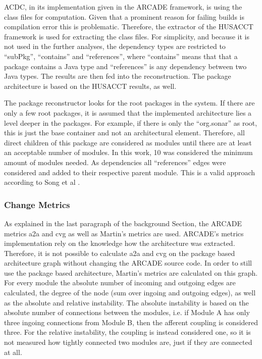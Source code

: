 \documentclass[conference]{IEEEtran}
\begin{document}
ACDC, in its implementation given in the ARCADE framework, is using the class files for computation. Given that a prominent reason for failing builds is compilation error this is problematic. Therefore, the extractor of the HUSACCT framework is used for extracting the class files. For simplicity, and because it is not used in the further analyses, the dependency types are restricted to ``subPkg'', ``contains'' and ``references'', where ``contains'' means that that a package contains a Java type and ``references'' is any dependency between two Java types. The results are then fed into the reconstruction. The package architecture is based on the HUSACCT results, as well. 

The package reconstructor looks for the root packages in the system. If there are only a few root packages, it is assumed that the implemented architecture lies a level deeper in the packages. For example, if there is only the ``org.sonar'' as root, this is just the base container and not an architectural element. Therefore, all direct children of this package are considered as modules until there are at least an acceptable number of modules. In this work, 10 was considered the minimum amount of modules needed. As dependencies all ``references'' edges were considered and added to their respective parent module. This is a valid approach according to Song et al \cite{ArcAsGraph}. 

\subsubsection{Change Metrics}

As explained in the last paragraph of the background Section, the ARCADE metrics a2a and cvg as well as Martin's metrics are used. ARCADE's metrics implementation rely on the knowledge how the architecture was extracted. Therefore, it is not possible to calculate a2a and cvg on the package based architecture graph without changing the ARCADE source code. In order to still use the package based architecture, Martin's metrics are calculated on this graph. For every module the absolute number of incoming and outgoing edges are calculated, the degree of the node (sum over ingoing and outgoing edges), as well as the absolute and relative instability. The absolute instability is based on the absolute number of connections between the modules, i.e. if Module A has only three ingoing connections from Module B, then the afferent coupling is considered three. For the relative instability, the coupling is instead considered one, so it is not measured how tightly connected two modules are, just if they are connected at all.
\end{document}

